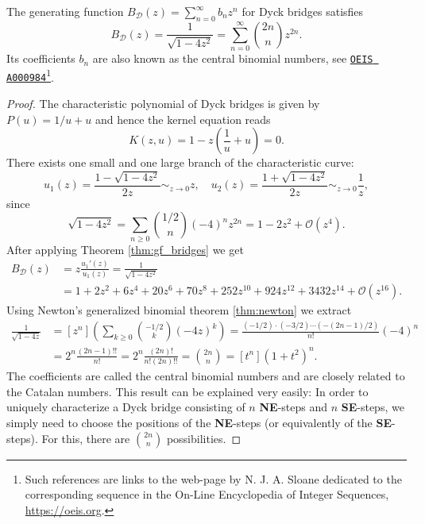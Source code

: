 \begin{corollary}
  The generating function $B_{\mathcal{D}}(z) = \sum_{n = 0}^\infty b_n z^n$ for Dyck bridges satisfies 
  $$
    B_{\mathcal{D}}(z) = \frac{1}{\sqrt{1 -  4z^2}} = \sum_{n = 0}^\infty \binom{2n}{n} z^{2n}.
  $$
  Its coefficients $b_n$ are also known as the central binomial numbers, see \href{https://oeis.org/A000984}{\texttt{OEIS A000984}}\footnote{Such references are links to the web-page by N. J. A. Sloane dedicated to the corresponding sequence in the On-Line Encyclopedia of Integer Sequences, \url{https://oeis.org}.}.
\end{corollary}

\begin{proof}
  The characteristic polynomial of Dyck bridges is given by $P(u) = 1/u + u$ and hence the kernel equation reads 
  $$
    K(z,u) = 1 - z\left(\frac{1}{u} + u \right) = 0.
  $$
  There exists one small and one large branch of the characteristic curve: 
  $$
    u_1(z) = \frac{1- \sqrt{1 - 4z^2}}{2z} \sim_{z \to 0} z, \quad
    u_2(z) = \frac{1 + \sqrt{1 - 4z^2}}{2z} \sim_{z \to 0} \frac{1}{z},
  $$
  since 
  $$
    \sqrt{1 - 4z^2} = \sum_{n \geq 0} \binom{1/2}{n} (-4)^n z^{2n} = 1 - 2z^2 + \mathcal{O}(z^4).
  $$
  After applying Theorem \ref{thm:gf_bridges} we get 
  \begin{align*}
    B_\mathcal{D}(z) &= z \frac{u_1'(z)}{u_1(z)} 
    = \frac{1}{\sqrt{1 - 4z^2}} \\
    &= 1 + 2z^2 + 6z^4 + 20z^6 + 70z^8 + 252z^{10} + 924z^{12} + 3432z^{14} + \mathcal{O}(z^{16}).
  \end{align*}
  Using Newton's generalized binomial theorem \ref{thm:newton} we extract
  \begin{align*}
    [z^n] \frac{1}{\sqrt{1 - 4z}} &=
    [z^n] \left(\sum_{k \geq 0} \binom{-1/2}{k}(-4z)^k\right) 
    = \frac{(-1/2)\cdot(-3/2)\cdots  (-(2n-1)/2)}{n!}(-4)^n \\
    &= 2^n \frac{(2n-1)!!}{n!} 
    = 2^n \frac{(2n)!}{n!(2n)!!}
    = \binom{2n}{n}
    = [t^n](1+t^2)^n.
  \end{align*}
  The coefficients are called the central binomial numbers and are closely related to the Catalan numbers. This result can be explained very easily: In order to uniquely characterize a Dyck bridge consisting of $n$ \textbf{NE}-steps and $n$ \textbf{SE}-steps, we simply need to choose the positions of the  \textbf{NE}-steps (or equivalently of the \textbf{SE}-steps). For this, there are $\binom{2n}{n}$ possibilities.
\end{proof}

